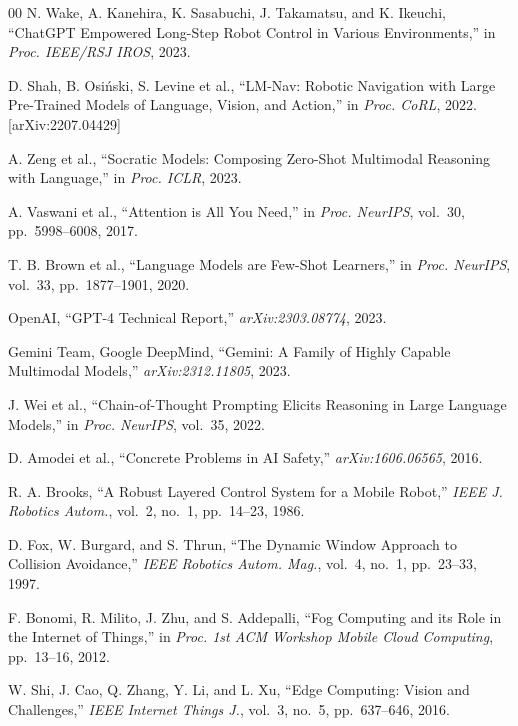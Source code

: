 \documentclass[conference]{IEEEtran}
\begin{document}
\begin{thebibliography}{00}
N. Wake, A. Kanehira, K. Sasabuchi, J. Takamatsu, and K. Ikeuchi,
``ChatGPT Empowered Long-Step Robot Control in Various Environments,''
in \textit{Proc. IEEE/RSJ IROS}, 2023.

D. Shah, B. Osi\'nski, S. Levine et al.,
``LM-Nav: Robotic Navigation with Large Pre-Trained Models of Language,
Vision, and Action,''
in \textit{Proc. CoRL}, 2022. [arXiv:2207.04429]

A. Zeng et al.,
``Socratic Models: Composing Zero-Shot Multimodal Reasoning with Language,''
in \textit{Proc. ICLR}, 2023.

A. Vaswani et al.,
``Attention is All You Need,''
in \textit{Proc. NeurIPS}, vol.~30, pp.~5998--6008, 2017.

T. B. Brown et al.,
``Language Models are Few-Shot Learners,''
in \textit{Proc. NeurIPS}, vol.~33, pp.~1877--1901, 2020.

OpenAI,
``GPT-4 Technical Report,'' \textit{arXiv:2303.08774}, 2023.

Gemini Team, Google DeepMind,
``Gemini: A Family of Highly Capable Multimodal Models,''
\textit{arXiv:2312.11805}, 2023.

J. Wei et al.,
``Chain-of-Thought Prompting Elicits Reasoning in Large Language Models,''
in \textit{Proc. NeurIPS}, vol.~35, 2022.

D. Amodei et al.,
``Concrete Problems in AI Safety,'' \textit{arXiv:1606.06565}, 2016.

R. A. Brooks,
``A Robust Layered Control System for a Mobile Robot,''
\textit{IEEE J. Robotics Autom.}, vol.~2, no.~1, pp.~14--23, 1986.

D. Fox, W. Burgard, and S. Thrun,
``The Dynamic Window Approach to Collision Avoidance,''
\textit{IEEE Robotics Autom. Mag.}, vol.~4, no.~1, pp.~23--33, 1997.

F. Bonomi, R. Milito, J. Zhu, and S. Addepalli,
``Fog Computing and its Role in the Internet of Things,''
in \textit{Proc. 1st ACM Workshop Mobile Cloud Computing}, pp.~13--16, 2012.

W. Shi, J. Cao, Q. Zhang, Y. Li, and L. Xu,
``Edge Computing: Vision and Challenges,''
\textit{IEEE Internet Things J.}, vol.~3, no.~5, pp.~637--646, 2016.


\end{thebibliography}
\end{document}
